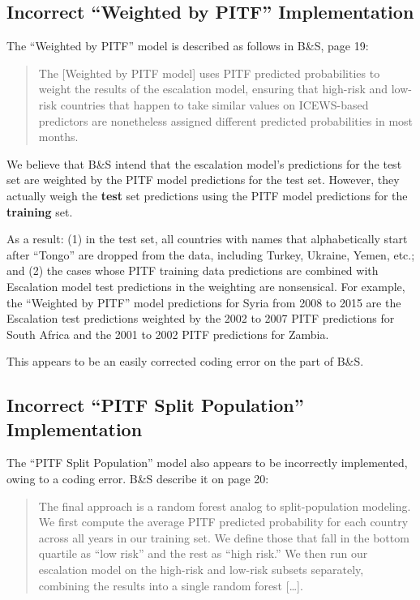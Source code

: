 \documentclass[
]{article}
\begin{document}
\hypertarget{incorrect-weighted-by-pitf-implementation}{%
\subsection{Incorrect ``Weighted by PITF'' Implementation}\label{incorrect-weighted-by-pitf-implementation}}

The ``Weighted by PITF'' model is described as follows in B\&S, page 19:

\begin{quote}
The {[}Weighted by PITF model{]} uses PITF predicted probabilities to weight the results of the escalation model, ensuring that high-risk and low-risk countries that happen to take similar values on ICEWS-based predictors are nonetheless assigned different predicted probabilities in most months.
\end{quote}

We believe that B\&S intend that the escalation model's predictions for the test set are weighted by the PITF model predictions for the test set. However, they actually weigh the \textbf{test} set predictions using the PITF model predictions for the \textbf{training} set.

As a result: (1) in the test set, all countries with names that alphabetically start after ``Tongo'' are dropped from the data, including Turkey, Ukraine, Yemen, etc.; and (2) the cases whose PITF training data predictions are combined with Escalation model test predictions in the weighting are nonsensical. For example, the ``Weighted by PITF'' model predictions for Syria from 2008 to 2015 are the Escalation test predictions weighted by the 2002 to 2007 PITF predictions for South Africa and the 2001 to 2002 PITF predictions for Zambia.

This appears to be an easily corrected coding error on the part of B\&S.

\hypertarget{incorrect-pitf-split-population-implementation}{%
\subsection{Incorrect ``PITF Split Population'' Implementation}\label{incorrect-pitf-split-population-implementation}}

The ``PITF Split Population'' model also appears to be incorrectly implemented, owing to a coding error. B\&S describe it on page 20:

\begin{quote}
The final approach is a random forest analog to split-population modeling. We first compute the average PITF predicted probability for each country across all years in our training set. We define those that fall in the bottom quartile as ``low risk'' and the rest as ``high risk.'' We then run our escalation model on the high-risk and low-risk subsets separately, combining the results into a single random forest {[}\ldots{]}.
\end{quote}
\end{document}
